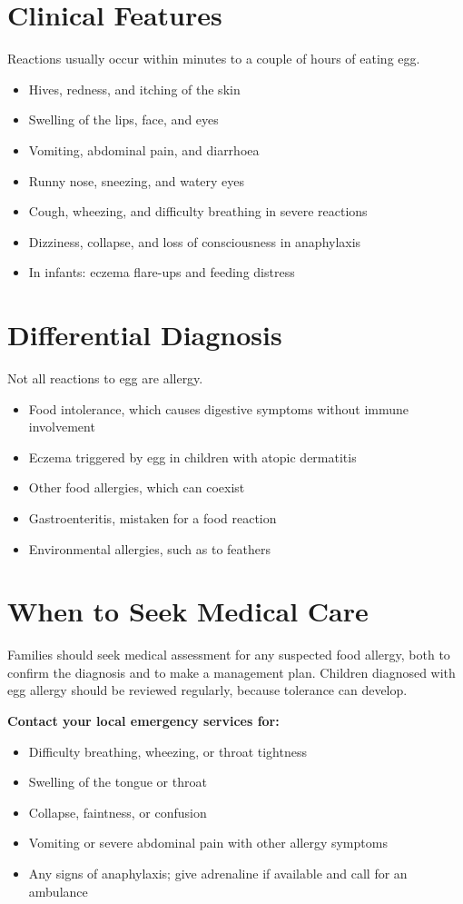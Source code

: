 \section*{Clinical Features}
Reactions usually occur within minutes to a couple of hours of eating egg.
\begin{itemize}
    \item Hives, redness, and itching of the skin
    \item Swelling of the lips, face, and eyes
    \item Vomiting, abdominal pain, and diarrhoea
    \item Runny nose, sneezing, and watery eyes
    \item Cough, wheezing, and difficulty breathing in severe reactions
    \item Dizziness, collapse, and loss of consciousness in anaphylaxis
    \item In infants: eczema flare-ups and feeding distress
\end{itemize}

\section*{Differential Diagnosis}
Not all reactions to egg are allergy.
\begin{itemize}
    \item Food intolerance, which causes digestive symptoms without immune involvement
    \item Eczema triggered by egg in children with atopic dermatitis
    \item Other food allergies, which can coexist
    \item Gastroenteritis, mistaken for a food reaction
    \item Environmental allergies, such as to feathers
\end{itemize}

\section*{When to Seek Medical Care}
Families should seek medical assessment for any suspected food allergy, both to confirm the diagnosis and to make a management plan. Children diagnosed with egg allergy should be reviewed regularly, because tolerance can develop.

\textbf{Contact your local emergency services for:}
\begin{itemize}
    \item Difficulty breathing, wheezing, or throat tightness
    \item Swelling of the tongue or throat
    \item Collapse, faintness, or confusion
    \item Vomiting or severe abdominal pain with other allergy symptoms
    \item Any signs of anaphylaxis; give adrenaline if available and call for an ambulance
\end{itemize}

